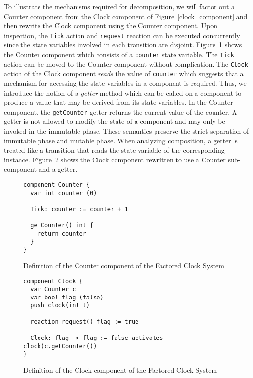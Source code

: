 To illustrate the mechanisms required for decomposition, we will factor out a Counter component from the Clock component of Figure~\ref{clock_component} and then rewrite the Clock component using the Counter component.
Upon inspection, the \verb+Tick+ action and \verb+request+ reaction can be executed concurrently since the state variables involved in each transition are disjoint.
Figure~\ref{counter_component} shows the Counter component which consists of a \verb+counter+ state variable.
The \verb+Tick+ action can be moved to the Counter component without complication.
The \verb+Clock+ action of the Clock component \emph{reads} the value of \verb+counter+ which suggests that a mechanism for accessing the state variables in a component is required.
Thus, we introduce the notion of a \emph{getter} method which can be called on a component to produce a value that may be derived from its state variables.
In the Counter component, the \verb+getCounter+ getter returns the current value of the counter.
A getter is not allowed to modify the state of a component and may only be invoked in the immutable phase.
These semantics preserve the strict separation of immutable phase and mutable phase.
When analyzing composition, a getter is treated like a transition that reads the state variable of the corresponding instance.
Figure~\ref{factored_clock_component} shows the Clock component rewritten to use a Counter sub-component and a getter.

\begin{figure}
\begin{verbatim}
component Counter {
  var int counter (0)

  Tick: counter := counter + 1

  getCounter() int {
    return counter
  }
}
\end{verbatim}
\caption{Definition of the Counter component of the Factored Clock System}
\label{counter_component}
\end{figure}

\begin{figure}
\begin{verbatim}
component Clock {
  var Counter c
  var bool flag (false)
  push clock(int t)

  reaction request() flag := true

  Clock: flag -> flag := false activates clock(c.getCounter())
}
\end{verbatim}
\caption{Definition of the Clock component of the Factored Clock System}
\label{factored_clock_component}
\end{figure}


